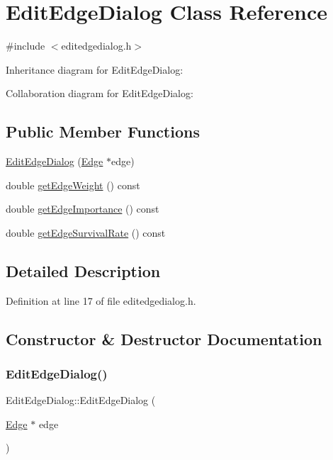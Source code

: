 \hypertarget{class_edit_edge_dialog}{}\section{Edit\+Edge\+Dialog Class Reference}
\label{class_edit_edge_dialog}


{\ttfamily \#include $<$editedgedialog.\+h$>$}



Inheritance diagram for Edit\+Edge\+Dialog\+:


Collaboration diagram for Edit\+Edge\+Dialog\+:
\subsection*{Public Member Functions}
\begin{DoxyCompactItemize}
\item 
\mbox{\hyperlink{class_edit_edge_dialog_a2c74f6de2329989a559918ebd60b31b0}{Edit\+Edge\+Dialog}} (\mbox{\hyperlink{class_edge}{Edge}} $\ast$edge)
\item 
double \mbox{\hyperlink{class_edit_edge_dialog_a0342c98517f14a49fd2f40d01e400154}{get\+Edge\+Weight}} () const
\item 
double \mbox{\hyperlink{class_edit_edge_dialog_a0a22d131d347363511e010557581f60b}{get\+Edge\+Importance}} () const
\item 
double \mbox{\hyperlink{class_edit_edge_dialog_a211adaab8e8221e69cbc8e3e3f19f83a}{get\+Edge\+Survival\+Rate}} () const
\end{DoxyCompactItemize}


\subsection{Detailed Description}


Definition at line 17 of file editedgedialog.\+h.



\subsection{Constructor \& Destructor Documentation}
\mbox{\label{class_edit_edge_dialog_a2c74f6de2329989a559918ebd60b31b0}} 
\subsubsection{\texorpdfstring{Edit\+Edge\+Dialog()}{EditEdgeDialog()}}
{\footnotesize\ttfamily Edit\+Edge\+Dialog\+::\+Edit\+Edge\+Dialog (\begin{DoxyParamCaption}\item[{\mbox{\hyperlink{class_edge}{Edge}} $\ast$}]{edge }\end{DoxyParamCaption})}



